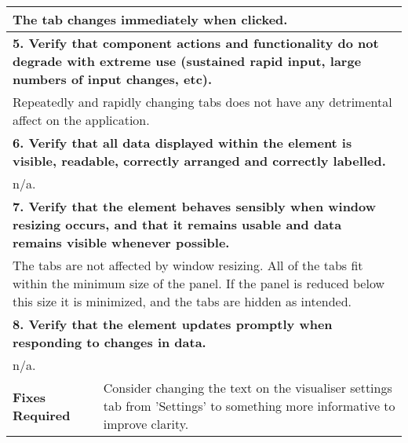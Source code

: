 \begin{longtable}{ l p{10cm} }
 \multicolumn{2}{p{14cm}}{The tab changes immediately when clicked.}\\
 \hline
 \multicolumn{2}{p{14cm}}{\textbf{5. Verify that component actions and functionality do not degrade with extreme use (sustained rapid input, large numbers of input changes, etc).}}\\
 \multicolumn{2}{p{14cm}}{Repeatedly and rapidly changing tabs does not have any detrimental affect on the application.}\\
 \hline
 \multicolumn{2}{p{14cm}}{\textbf{6. Verify that all data displayed within the element is visible, readable, correctly arranged and correctly labelled.}}\\
 \multicolumn{2}{p{14cm}}{n/a.}\\
 \hline
 \multicolumn{2}{p{14cm}}{\textbf{7. Verify that the element behaves sensibly when window resizing occurs, and that it remains usable and data remains visible whenever possible.}}\\
 \multicolumn{2}{p{14cm}}{The tabs are not affected by window resizing. All of the tabs fit within the minimum size of the panel. If the panel is reduced below this size it is minimized, and the tabs are hidden as intended.}\\
 \hline
 \multicolumn{2}{p{14cm}}{\textbf{8. Verify that the element updates promptly when responding to changes in data.}}\\
 \multicolumn{2}{p{14cm}}{n/a.}\\
 \hline
 \textbf{Fixes Required} & Consider changing the text on the visualiser settings tab from 'Settings' to something more informative to improve clarity.\\
 \bottomrule
\end{longtable}
\clearpage

